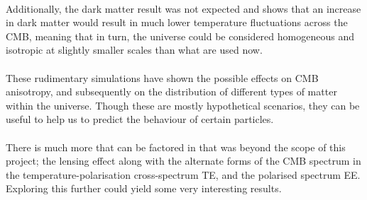 \documentclass[twoside, fontsize=12pt,
     bibliography=totoc, %
     listof=totoc, %
     index=totoc, %
     onehalfspacing %
]{_MScDiss2017_cls}
\begin{document}
\paragraph{}

Additionally, the dark matter result was not expected and shows that an increase in dark matter would result in much lower temperature fluctuations across the CMB, meaning that in turn, the universe could be considered homogeneous and isotropic at slightly smaller scales than what are used now.

\paragraph{}

These rudimentary simulations have shown the possible effects on CMB anisotropy, and subsequently on the distribution of different types of matter within the universe. Though these are mostly hypothetical scenarios, they can be useful to help us to predict the behaviour of certain particles.

\paragraph{}

There is much more that can be factored in that was beyond the scope of this project; the lensing effect along with the alternate forms of the CMB spectrum in the temperature-polarisation cross-spectrum TE, and the polarised spectrum EE. Exploring this further could yield some very interesting results.

\begin{singlespace}%
    
\end{singlespace}
\end{document}
